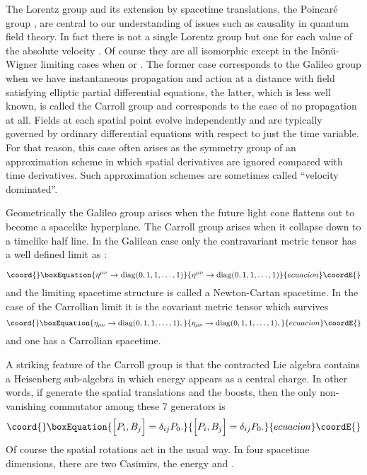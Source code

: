 \documentclass[a4paper,12pt]{article}
\begin{document}
The Lorentz group \coordHE{} and its extension by spacetime
translations, the  Poincar\'e group \coordHE{}, are central to our
understanding of  issues such as  causality  in quantum field
theory. In fact there is not a single Lorentz group but one for
each value of the absolute velocity \coordHE{}. Of course they are all
isomorphic except in the In\"on\"u-Wigner limiting cases when 
\coordHE{} or \coordHE{}. The former case corresponds to
the Galileo group when we have instantaneous propagation and
action at a distance with field satisfying elliptic partial
differential equations, the latter, which is less well known, is
called the Carroll group \cite{Leblond, Sen} and corresponds to
the case of no propagation at all. Fields at each spatial point
evolve independently and are typically governed by ordinary
differential equations with respect to just the time variable. For
that reason, this case often arises as the symmetry group of an
approximation scheme in which spatial derivatives are ignored
compared with time derivatives. Such approximation schemes are
sometimes called ``velocity dominated''.

Geometrically the Galileo group arises when the future light cone
flattens out to become a spacelike hyperplane. The Carroll group
arises when it collapse down to a timelike half line. In the
Galilean case only the contravariant metric tensor has a well
defined limit as \coordHE{}:

\begin{equation}\coord{}\boxEquation{ 
\eta ^{\mu \nu} \rightarrow {\rm diag} (0,1,1,\dots ,1) 
}{ 
\eta ^{\mu \nu} \rightarrow {\rm diag} (0,1,1,\dots ,1) 
}{ecuacion}\coordE{}\end{equation}
and the limiting spacetime structure is called a Newton-Cartan
spacetime. In the case of the Carrollian limit it is the covariant
metric tensor which survives
\begin{equation}\coord{}\boxEquation{ 
\eta_{\mu \nu } \rightarrow {\rm diag} (0,1,1,\dots, 1),
}{ 
\eta_{\mu \nu } \rightarrow {\rm diag} (0,1,1,\dots, 1),
}{ecuacion}\coordE{}\end{equation}
and one has a Carrollian spacetime.

A striking feature of the
Carroll group is that the contracted Lie algebra contains a
Heisenberg sub-algebra in which energy \coordHE{} appears as a central
charge. In other words, if \coordHE{} generate the spatial translations
and \coordHE{} the boosts, then the only non-vanishing commutator among
these  7 generators is
\begin{equation}\coord{}\boxEquation{ 
\Bigl [ P_i, B_j\Bigr ]= \delta_{ij} P_0.  
}{ 
\Bigl [ P_i, B_j\Bigr ]= \delta_{ij} P_0.  
}{ecuacion}\coordE{}\end{equation}
Of course the spatial rotations \coordHE{} act in the usual way. In
four spacetime dimensions,  there are two Casimirs, the energy
\coordHE{} and \coordHE{}.
\end{document}
